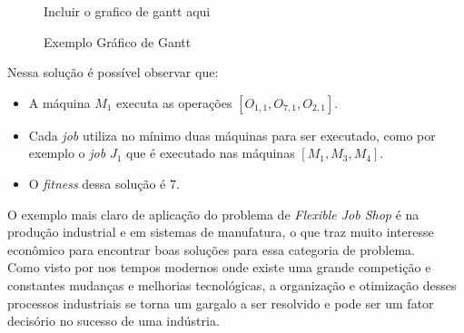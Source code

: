 \begin{figure}[ht]
    \centering
    \small{Incluir o grafico de gantt aqui}
    \caption{Exemplo Gráfico de Gantt}
    \label{fig:plot-gantt}
\end{figure}
            
\noindent Nessa solução é possível observar que:
\begin{itemize}
    \item A máquina $M_1$ executa as operações $[O_{1,1}, O_{7,1}, O_{2,1}]$.
    \item Cada \textit{job} utiliza no mínimo duas máquinas para ser executado, como por exemplo o \textit{job} $J_1$ que é executado nas máquinas $[M_1 , M_3, M_4]$.
    \item O \textit{fitness} dessa solução é $7$.
\end{itemize}
\indent O exemplo mais claro de aplicação do problema de \textit{Flexible Job Shop} é na produção industrial e em sistemas de manufatura, o que traz muito interesse econômico para encontrar boas soluções para essa categoria de problema.\\
%
\indent Como visto por \cite{Wari2016} nos tempos modernos onde existe uma grande competição e constantes mudanças e melhorias tecnológicas, a organização e otimização desses processos industriais se torna um gargalo a ser resolvido e pode ser um fator decisório no sucesso de uma indústria.





